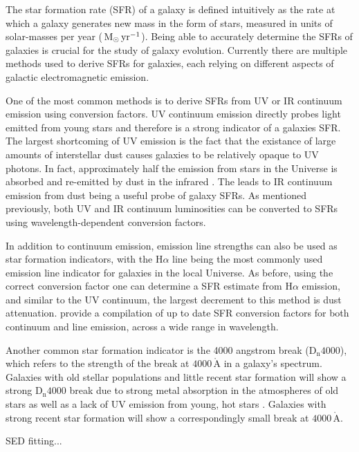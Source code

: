 The star formation rate (SFR) of a galaxy is defined intuitively as the rate
at which a galaxy generates new mass in the form of stars, measured in
units of solar-masses per year ($\,\mathrm{M_{\odot}}\,\mathrm{yr^{-1}}$).  Being
able to accurately determine the SFRs of galaxies is crucial for the
study of galaxy evolution.  Currently there are multiple methods used
to derive SFRs for galaxies, each relying on different aspects of
galactic electromagnetic emission.
\par
One of the most common methods is to derive SFRs from UV or IR
continuum 
emission using conversion factors.  UV continuum emission directly
probes light emitted from young stars and therefore is a strong
indicator of a galaxies SFR.  The largest shortcoming of UV emission
is the fact that the existance of large amounts of interstellar dust
causes galaxies to be relatively opaque to UV photons.  In fact,
approximately half the emission from stars in the Universe is absorbed
and re-emitted by dust in the infrared \citep{kennicutt2012}.
The leads to IR continuum emission from dust being a useful probe of
galaxy SFRs.  As mentioned previously, both UV and IR continuum
luminosities can be converted to SFRs using wavelength-dependent
conversion factors.
\par
In addition to continuum emission, emission line strengths can also be
used as star formation indicators, with the $\mathrm{H}\alpha$ line
being the most commonly used emission line indicator for galaxies in
the local Universe.  As before, using the correct conversion factor
one can determine a SFR estimate from $\mathrm{H}\alpha$ emission, and
similar to the UV continuum, the largest decrement to this method is
dust attenuation.  \citet{kennicutt2012} provide a compilation of up
to date SFR conversion factors for both continuum and line emission,
across a wide range in wavelength.
\par
Another common star formation indicator is the 4000 angstrom break
($\mathrm{D_n}4000$), which refers to the strength of the break at
$4000\,\mathrm{\mathring{A}}$ in a galaxy's spectrum.  Galaxies with
old stellar populations and little recent star formation will show a
strong $\mathrm{D_n}4000$ break due to strong metal absorption in the
atmospheres of old stars as well as a lack of UV emission from young,
hot stars \citep{hamilton1985}.  Galaxies with strong recent star
formation will show a correspondingly small break at
$4000\,\mathrm{\mathring{A}}$.
\par
SED fitting...
\par
